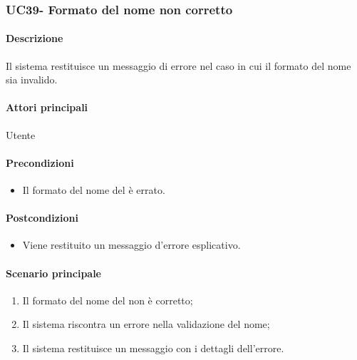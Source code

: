\subsubsection{UC39- Formato del nome non corretto}\label{UC39}
\paragraph*{Descrizione}
Il sistema restituisce un messaggio di errore nel caso in cui il formato del nome sia invalido.

\paragraph*{Attori principali}
Utente

\paragraph*{Precondizioni}
\begin{itemize}
  \item Il formato del nome del  è errato.
\end{itemize}

\paragraph*{Postcondizioni}
\begin{itemize}
  \item Viene restituito un messaggio d'errore esplicativo.
\end{itemize}

\paragraph*{Scenario principale}
\begin{enumerate}
  \item Il formato del nome del  non è corretto;
  \item Il sistema riscontra un errore nella validazione del nome;
  \item Il sistema restituisce un messaggio con i dettagli dell'errore.  
\end{enumerate}